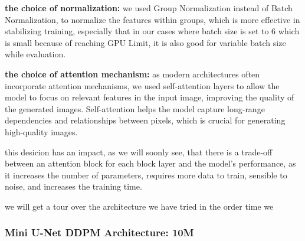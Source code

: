 \documentclass[twocolumn,superscriptaddress,aps]{revtex4-1}
\begin{document}
\textbf{the choice of normalization:} we used Group Normalization instead of Batch Normalization, to normalize the features within groups, which is more effective in stabilizing training, especially that in our cases where batch size is set to 6 which is small because of reaching GPU Limit, it is also good for variable batch size while evaluation.

\textbf{the choice of attention mechanism:} as modern architectures often incorporate attention mechanisms, we used self-attention layers to allow the model to focus on relevant features in the input image, improving the quality of the generated images. Self-attention helps the model capture long-range dependencies and relationships between pixels, which is crucial for generating high-quality images.

this desicion has an impact, as we will soonly see, that there is a trade-off between an attention block for each block layer and the model's performance, as it increases the number of parameters, requires more data to train, sensible to noise, and increases the training time. 

we will get a tour over the architecture we have tried in the order time we 






\subsubsection{Mini U-Net DDPM Architecture: 10M}


\end{document}
